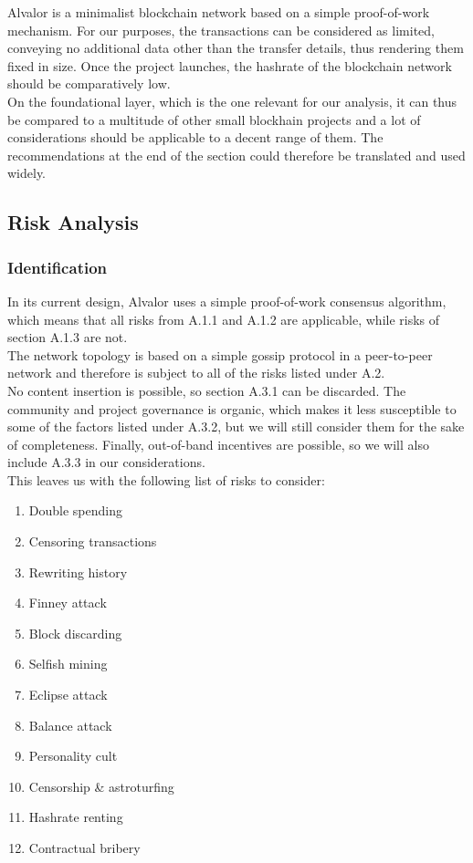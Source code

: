 \documentclass[11pt,a4paper]{article}
\begin{document}
Alvalor is a minimalist blockchain network based on a simple proof-of-work mechanism. For our purposes, the transactions can be considered as limited, conveying no additional data other than the transfer details, thus rendering them fixed in size. Once the project launches, the hashrate of the blockchain network should be comparatively low.\\

On the foundational layer, which is the one relevant for our analysis, it can thus be compared to a multitude of other small blockhain projects and a lot of considerations should be applicable to a decent range of them. The recommendations at the end of the section could therefore be translated and used widely.\\

\subsection{Risk Analysis}

\subsubsection{Identification}

In its current design, Alvalor uses a simple proof-of-work consensus algorithm, which means that all risks from A.1.1 and A.1.2 are applicable, while risks of section A.1.3 are not.\\

The network topology is based on a simple gossip protocol in a peer-to-peer network and therefore is subject to all of the risks listed under A.2.\\

No content insertion is possible, so section A.3.1 can be discarded. The community and project governance is organic, which makes it less susceptible to some of the factors listed under A.3.2, but we will still consider them for the sake of completeness. Finally, out-of-band incentives are possible, so we will also include A.3.3 in our considerations.\\

This leaves us with the following list of risks to consider:
\begin{enumerate}
  \item Double spending
  \item Censoring transactions
  \item Rewriting history
  \item Finney attack
  \item Block discarding
  \item Selfish mining
  \item Eclipse attack
  \item Balance attack
  \item Personality cult
  \item Censorship \& astroturfing
  \item Hashrate renting
  \item Contractual bribery
\end{enumerate}
\end{document}
